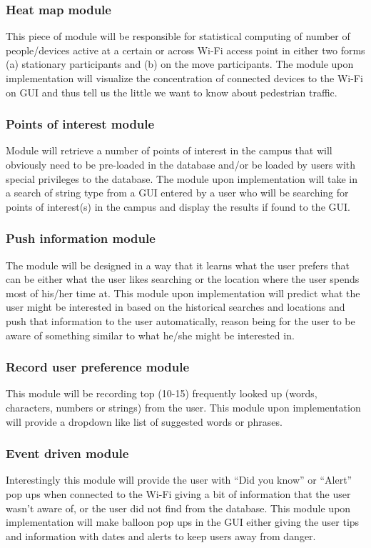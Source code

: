 \documentclass[11pt]{article}
\begin{document}
			\subsubsection{Heat map module}
			This piece of module will be responsible for statistical computing of number of people/devices active at a certain or across Wi-Fi access point in either two forms (a) stationary participants and (b) on the move participants. The module upon implementation will visualize the concentration of connected devices to the Wi-Fi on GUI and thus tell us the little we want to know about pedestrian traffic.
			\subsubsection{Points of interest module}
			Module will retrieve a number of points of interest in the campus that will obviously need to be pre-loaded in the database and/or be loaded by users with special privileges to the database. The module upon implementation will take in a search of string type from a GUI entered by a user who will be searching for points of interest(s) in the campus and display the results if found to the GUI.
			\subsubsection{Push information module}
			The module will be designed in a way that it learns what the user prefers that can be either what the user likes searching or the location where the user spends most of his/her time at. This module upon implementation will predict what the user might be interested in based on the historical searches and locations and push that information to the user automatically, reason being for the user to be aware of something similar to what he/she might be interested in.
			\subsubsection{Record user preference module}
			This module will be recording top (10-15) frequently looked up (words, characters, numbers or strings) from the user. This module upon implementation will provide a dropdown like list of suggested words or phrases.
			\subsubsection{Event driven module}
			Interestingly this module will provide the user with “Did you know” or “Alert” pop ups when connected to the Wi-Fi giving a bit of information that the user wasn’t aware of, or the user did not find from the database. This module upon implementation will make balloon pop ups in the GUI either giving the user tips and information with dates and alerts to keep users away from danger.
\end{document}
